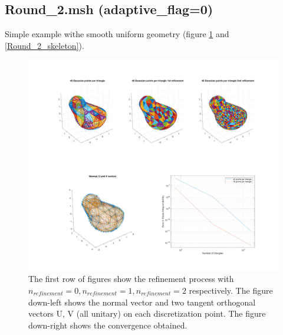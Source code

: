 \documentclass[11pt, oneside]{article}   	%
\begin{document}
\subsection{Round\_2.msh (adaptive\_flag=0)}
Simple example withe smooth uniform geometry (figure \ref{Round_2} and \ref{Round_2_skeleton}). 

\begin{figure}[H]
\begin{center}
\includegraphics[width=6in]{Round_2.pdf}
\end{center}
\caption{The first row of figures show the refinement process with $n_{refinement}=0, n_{refinement}=1, n_{refinement}=2$ respectively.
The figure down-left shows the normal vector and two tangent orthogonal vectors U, V (all unitary) on each discretization point. The figure down-right shows the convergence obtained.}
\label{Round_2}
\end{figure}
\end{document}
